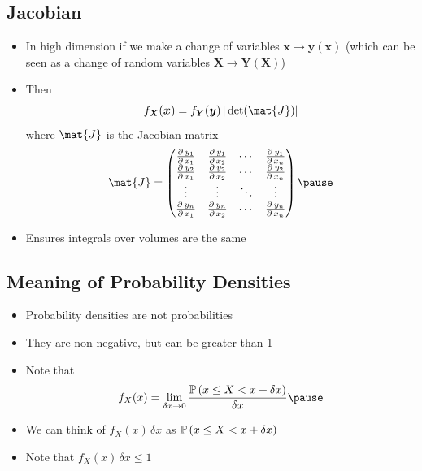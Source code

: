 \begin{slide}
\section[-1]{Jacobian}

\begin{PauseHighLight}
  \begin{itemize}
  \item In high dimension if we make a change of variables
    $\bm{x} \rightarrow \bm{y}(\bm{x})$ (which can be seen as a change
    of random variables $\bm{X}\rightarrow\bm{Y}(\bm{X})$)\pause
  \item Then
    \begin{align*}
      f_{\bm{X}}(\bm{x}) = f_{\bm{Y}}(\bm{y}) \, |\det(\mat{J})| 
    \end{align*}
    where $\mat{J}$ is the Jacobian matrix
    \begin{align*}
      \mat{J} =
      \begin{pmatrix}
        \pd{y_1}{x_1} & \pd{y_1}{x_2} & \cdots & \pd{y_1}{x_n} \\
        \pd{y_2}{x_1} & \pd{y_2}{x_2} & \cdots & \pd{y_2}{x_n} \\
        \vdots & \vdots & \ddots & \vdots \\
        \pd{y_n}{x_1} & \pd{y_n}{x_2} & \cdots & \pd{y_n}{x_n}
      \end{pmatrix}\pause
    \end{align*}
  \item Ensures integrals over volumes are the same\pause
  \end{itemize}
\end{PauseHighLight}

\end{slide}


\begin{slide}
\section{Meaning of Probability Densities}

\begin{PauseHighLight}
  \begin{itemize}
  \item Probability densities are not probabilities\pause
  \item They are non-negative, but can be greater than 1\pause
  \item Note that
    \begin{align*}
      f_X(x) = \lim_{\delta x\rightarrow 0}
      \frac{\Prob{x \leq X < x + \delta x}}{\delta x}\pause
    \end{align*}
  \item We can think of $f_X(x)\,\delta x$ as $\mathbb{P}\left( x \leq X < x +
      \delta x \right)$\pause
  \item Note that $f_X(x)\,\delta x\leq 1$\pause
  \end{itemize}
\end{PauseHighLight}

\end{slide}



